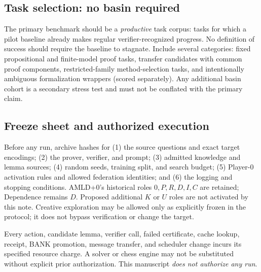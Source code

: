 \documentclass[11pt,letterpaper]{article}
\begin{document}
\subsection{Task selection: no basin required}
The primary benchmark should be a \emph{productive} task corpus: tasks for which a pilot baseline already makes regular verifier-recognized progress. No definition of success should require the baseline to stagnate. Include several categories: fixed propositional and finite-model proof tasks, transfer candidates with common proof components, restricted-family method-selection tasks, and intentionally ambiguous formalization wrappers (scored separately). Any additional basin cohort is a secondary stress test and must not be conflated with the primary claim.

\subsection{Freeze sheet and authorized execution}
Before any run, archive hashes for (1) the source questions and exact target encodings; (2) the prover, verifier, and prompt; (3) admitted knowledge and lemma sources; (4) random seeds, training split, and search budget; (5) Player-0 activation rules and allowed federation identities; and (6) the logging and stopping conditions. AMLD+0's historical roles $0,P,R,D,I,C$ are retained; Dependence remains $D$. Proposed additional $K$ or $U$ roles are not activated by this note. Creative exploration may be allowed only as explicitly frozen in the protocol; it does not bypass verification or change the target.

Every action, candidate lemma, verifier call, failed certificate, cache lookup, receipt, BANK promotion, message transfer, and scheduler change incurs its specified resource charge. A solver or chess engine may not be substituted without explicit prior authorization. This manuscript \emph{does not authorize any run}.
\end{document}

